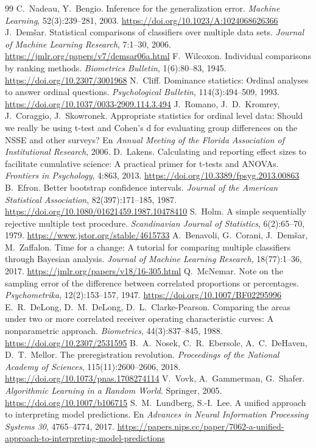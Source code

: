 \documentclass[11pt,a4paper]{article}
\newcommand{\doi}[1]{\url{https://doi.org/#1}}
\begin{document}
\begin{thebibliography}{99}
 C.~Nadeau, Y.~Bengio. Inference for the generalization error. \emph{Machine Learning}, 52(3):239--281, 2003. \doi{10.1023/A:1024068626366}
 J.~Demšar. Statistical comparisons of classifiers over multiple data sets. \emph{Journal of Machine Learning Research}, 7:1--30, 2006. \url{https://jmlr.org/papers/v7/demsar06a.html}
 F.~Wilcoxon. Individual comparisons by ranking methods. \emph{Biometrics Bulletin}, 1(6):80--83, 1945. \doi{10.2307/3001968}
 N.~Cliff. Dominance statistics: Ordinal analyses to answer ordinal questions. \emph{Psychological Bulletin}, 114(3):494--509, 1993. \doi{10.1037/0033-2909.114.3.494}
 J.~Romano, J.~D.~Kromrey, J.~Coraggio, J.~Skowronek. Appropriate statistics for ordinal level data: Should we really be using t-test and Cohen's d for evaluating group differences on the NSSE and other surveys? En \emph{Annual Meeting of the Florida Association of Institutional Research}, 2006.
 D.~Lakens. Calculating and reporting effect sizes to facilitate cumulative science: A practical primer for t-tests and ANOVAs. \emph{Frontiers in Psychology}, 4:863, 2013. \doi{10.3389/fpsyg.2013.00863}
 B.~Efron. Better bootstrap confidence intervals. \emph{Journal of the American Statistical Association}, 82(397):171--185, 1987. \doi{10.1080/01621459.1987.10478410}
 S.~Holm. A simple sequentially rejective multiple test procedure. \emph{Scandinavian Journal of Statistics}, 6(2):65--70, 1979. \url{https://www.jstor.org/stable/4615733}
 A.~Benavoli, G.~Corani, J.~Demšar, M.~Zaffalon. Time for a change: A tutorial for comparing multiple classifiers through Bayesian analysis. \emph{Journal of Machine Learning Research}, 18(77):1--36, 2017. \url{https://jmlr.org/papers/v18/16-305.html}
 Q.~McNemar. Note on the sampling error of the difference between correlated proportions or percentages. \emph{Psychometrika}, 12(2):153--157, 1947. \doi{10.1007/BF02295996}
 E.~R.~DeLong, D.~M.~DeLong, D.~L.~Clarke-Pearson. Comparing the areas under two or more correlated receiver operating characteristic curves: A nonparametric approach. \emph{Biometrics}, 44(3):837--845, 1988. \doi{10.2307/2531595}
 B.~A.~Nosek, C.~R.~Ebersole, A.~C.~DeHaven, D.~T.~Mellor. The preregistration revolution. \emph{Proceedings of the National Academy of Sciences}, 115(11):2600--2606, 2018. \doi{10.1073/pnas.1708274114}
 V.~Vovk, A.~Gammerman, G.~Shafer. \emph{Algorithmic Learning in a Random World}. Springer, 2005. \doi{10.1007/b106715}
 S.~M.~Lundberg, S.-I.~Lee. A unified approach to interpreting model predictions. En \emph{Advances in Neural Information Processing Systems 30}, 4765--4774, 2017. \url{https://papers.nips.cc/paper/7062-a-unified-approach-to-interpreting-model-predictions}
\end{thebibliography}
\end{document}
